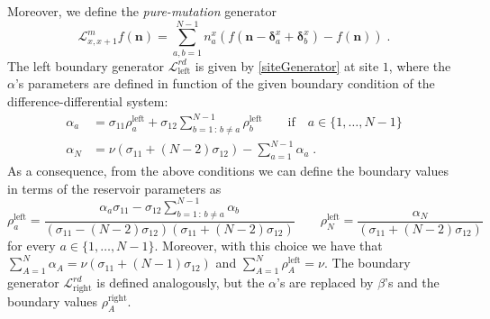 \documentclass[10pt]{article}
\numberwithin{equation}{section}
\numberwithin{equation}{subsection}
\newtheorem{remark}{Remark}
\newcommand{\dt}{\;.}
\begin{document}
Moreover, we define the \textit{pure-mutation} generator
\begin{equation}
	\mathcal{L}_{x,x+1}^{m}f(\bm{n})=\sum_{a,b=1}^{N-1}n_{a}^{x}\left(f(\bm{n}-\bm{\delta}_{a}^{x}+\bm{\delta}_{b}^{x})-f(\bm{n})\right)\dt
\end{equation}
The left boundary generator $\mathcal{L}_{\text{left}}^{rd}$ is given by \eqref{siteGenerator} at site $1$,
where the $\alpha$'s parameters are defined in function of the given boundary condition of the difference-differential system:
\begin{align}\label{boundaryParamRD}
		\alpha_{a}&=\sigma_{11}\rho_{a}^{\text{left}}+\sigma_{12}\sum_{b=1\,:\,b\neq a}^{N-1}\rho_{b}^{\text{left}}\qquad \text{if} \quad a\in \{1,\ldots,N-1\}\nonumber\\
		\alpha_{N}&=\nu\left(\sigma_{11}+(N-2)\sigma_{12}\right)-\sum_{a=1}^{N-1}\alpha_{a}\dt
\end{align}
As a consequence, from the above conditions we can define the boundary values in terms of the reservoir parameters as
\begin{equation}
	\rho_{a}^{\text{left}}=\frac{\alpha_{a}\sigma_{11}-\sigma_{12}\sum_{b=1\,:\,b\neq a}^{N-1}\alpha_{b}}{(\sigma_{11}-(N-2)\sigma_{12})(\sigma_{11}+(N-2)\sigma_{12})}\qquad \rho_{N}^{\text{left}}=\frac{\alpha_{N}}{(\sigma_{11}+(N-2)\sigma_{12})}
\end{equation}
for every $a\in\{1,\ldots,N-1\}$. Moreover, with this choice we have that $\sum_{A=1}^{N}\alpha_{A}=\nu(\sigma_{11}+(N-1)\sigma_{12})$ and $\sum_{A=1}^{N}\rho_{A}^{\text{left}}=\nu$. 
The boundary generator $\mathcal{L}_{\text{right}}^{rd}$ is defined analogously, but the $\alpha$'s are replaced by $\beta$'s and the boundary values $\rho_{A}^{\text{right}}$.
\end{document}
